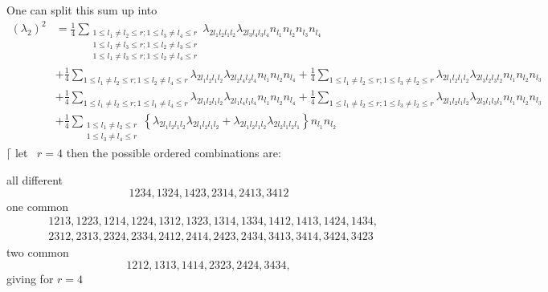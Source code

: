 \documentclass[aps,preprint]{revtex4}%
\begin{document}
One can split this sum up into
\begin{align}
\left(  \lambda_{2}\right)  ^{2}  &  =\frac{1}{4}\sum_{\substack{1\leq
l_{1}\neq l_{2}\leq r;1\leq l_{3}\neq l_{4}\leq r\\1\leq l_{1}\neq l_{3}\leq
r;1\leq l_{2}\neq l_{3}\leq r\\1\leq l_{1}\neq l_{3}\leq r;1\leq l_{2}\neq
l_{4}\leq r}}\lambda_{2l_{1}l_{2}l_{1}l_{2}}\lambda_{2l_{3}l_{4}l_{3}l_{4}%
}n_{l_{1}}n_{l_{2}}n_{l_{3}}n_{l_{4}}\nonumber\\
&  +\frac{1}{4}\sum_{1\leq l_{1}\neq l_{2}\leq r;1\leq l_{2}\neq l_{4}\leq
r}\lambda_{2l_{1}l_{2}l_{1}l_{2}}\lambda_{2l_{2}l_{4}l_{2}l_{4}}n_{l_{1}%
}n_{l_{2}}n_{l_{4}}+\frac{1}{4}\sum_{1\leq l_{1}\neq l_{2}\leq r;1\leq
l_{3}\neq l_{2}\leq r}\lambda_{2l_{1}l_{2}l_{1}l_{2}}\lambda_{2l_{3}l_{2}%
l_{3}l_{2}}n_{l_{1}}n_{l_{2}}n_{l_{3}}\nonumber\\
&  +\frac{1}{4}\sum_{1\leq l_{1}\neq l_{2}\leq r;1\leq l_{1}\neq l_{4}\leq
r}\lambda_{2l_{1}l_{2}l_{1}l_{2}}\lambda_{2l_{1}l_{4}l_{1}l_{4}}n_{l_{1}%
}n_{l_{2}}n_{l_{4}}+\frac{1}{4}\sum_{1\leq l_{1}\neq l_{2}\leq r;1\leq
l_{3}\neq l_{2}\leq r}\lambda_{2l_{1}l_{2}l_{1}l_{2}}\lambda_{2l_{3}l_{1}%
l_{3}l_{1}}n_{l_{1}}n_{l_{2}}n_{l_{3}}\nonumber\\
&  +\frac{1}{4}\sum_{\substack{1\leq l_{1}\neq l_{2}\leq r\\1\leq l_{3}\neq
l_{4}\leq r}}\left\{  \lambda_{2l_{1}l_{2}l_{1}l_{2}}\lambda_{2l_{1}l_{2}%
l_{1}l_{2}}+\lambda_{2l_{1}l_{2}l_{1}l_{2}}\lambda_{2l_{2}l_{1}l_{2}l_{1}%
}\right\}  n_{l_{1}}n_{l_{2}}%
\end{align}
$\lceil$ let \ $r=4$ then the possible ordered combinations are:

all different%
\[
1234,1324,1423,2314,2413,3412
\]
one common%
\begin{align*}
&  1213,1223,1214,1224,1312,1323,1314,1334,1412,1413,1424,1434,\\
&  2312,2313,2324,2334,2412,2414,2423,2434,3413,3414,3424,3423
\end{align*}
two common%
\[
1212,1313,1414,2323,2424,3434,
\]
giving for $r=4$%
\end{document}
